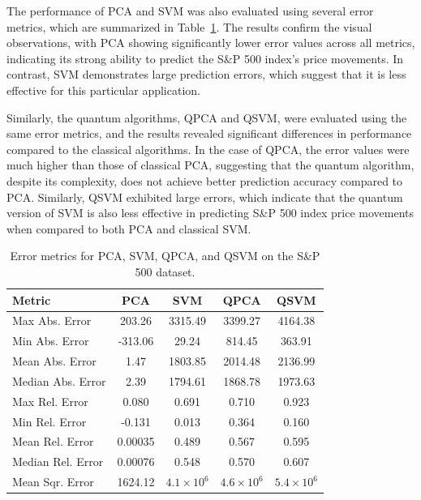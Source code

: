 \documentclass[journal]{IEEEtran}
\begin{document}
The performance of PCA and SVM was also evaluated using several error metrics, which are summarized in Table~\ref{tab:error_metrics}. The results confirm the visual observations, with PCA showing significantly lower error values across all metrics, indicating its strong ability to predict the S\&P 500 index's price movements. In contrast, SVM demonstrates large prediction errors, which suggest that it is less effective for this particular application.

Similarly, the quantum algorithms, QPCA and QSVM, were evaluated using the same error metrics, and the results revealed significant differences in performance compared to the classical algorithms. In the case of QPCA, the error values were much higher than those of classical PCA, suggesting that the quantum algorithm, despite its complexity, does not achieve better prediction accuracy compared to PCA. Similarly, QSVM exhibited large errors, which indicate that the quantum version of SVM is also less effective in predicting S\&P 500 index price movements when compared to both PCA and classical SVM.

\begin{table}[ht!]
    \centering
    \begin{tabular}{|l|c|c|c|c|}
        \hline
        \textbf{Metric} & \textbf{PCA} & \textbf{SVM} & \textbf{QPCA} & \textbf{QSVM} \\
        \hline
        Max Abs. Error & 203.26 & 3315.49 & 3399.27 & 4164.38 \\
        Min Abs. Error & -313.06 & 29.24 & 814.45 & 363.91 \\
        Mean Abs. Error & 1.47 & 1803.85 & 2014.48 & 2136.99 \\
        Median Abs. Error & 2.39 & 1794.61 & 1868.78 & 1973.63 \\
        Max Rel. Error & 0.080 & 0.691 & 0.710 & 0.923 \\
        Min Rel. Error & -0.131 & 0.013 & 0.364 & 0.160 \\
        Mean Rel. Error & 0.00035 & 0.489 & 0.567 & 0.595 \\
        Median Rel. Error & 0.00076 & 0.548 & 0.570 & 0.607 \\
        Mean Sqr. Error & 1624.12 & $4.1 \times 10^6$ & $4.6 \times 10^6$ & $5.4 \times 10^6$ \\
        \hline
    \end{tabular}
    \vspace{1em}
    \caption{Error metrics for PCA, SVM, QPCA, and QSVM on the S\&P 500 dataset.}
    \label{tab:error_metrics}
\end{table}
\end{document}
